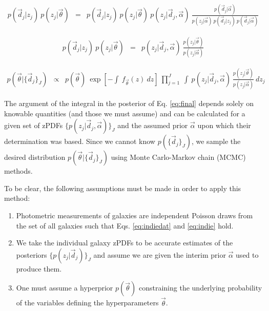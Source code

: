 \documentclass[preprint]{aastex}
\begin{document}
\begin{eqnarray}
\label{eq:indterm}
p(\vec{d}_{j}|z_{j})\ p(z_{j}|\vec{\theta}) &=& p(\vec{d}_{j}|z_{j})\ p(z_{j}|\vec{\theta})\ p(z_{j}|\vec{d}_{j},\vec{\alpha})\ \frac{p(\vec{d}_{j}|\vec{\alpha})}{p(z_{j}|\vec{\alpha})\ p(\vec{d}_{j}|z_{j})\ p(\vec{d}_{j}|\vec{\alpha})}
\end{eqnarray}

\begin{eqnarray}
\label{eq:cancel}
p(\vec{d}_{j}|z_{j})\ p(z_{j}|\vec{\theta}) &=& p(z_{j}|\vec{d}_{j},\vec{\alpha})\ \frac{p(z_{j}|\vec{\theta})}{p(z_{j}|\vec{\alpha})}
\end{eqnarray}

\begin{eqnarray}
\label{eq:final}
p(\vec{\theta}|\{\vec{d}_{j}\}_{J}) &\propto& p(\vec{\theta})\ \exp\left[-\int\ f_{\vec{\theta}}(z)\ dz\right]\ \prod_{j=1}^{J}\ \int\ p(z_{j}|\vec{d}_{j},\vec{\alpha})\ \frac{p(z_{j}|\vec{\theta})}{p(z_{j}|\vec{\alpha})}\ dz_{j}
\end{eqnarray}

The argument of the integral in the posterior of Eq. \ref{eq:final} depends solely on knowable quantities (and those we must assume) and can be calculated for a given set of zPDFs $\{p(z_{j}|\vec{d}_{j},\vec{\alpha})\}_{J}$ and the assumed prior $\vec{\alpha}$ upon which their determination was based.  Since we cannot know $p(\{\vec{d}_{j}\}_{J})$, we sample the desired distribution $p(\vec{\theta}|\{\vec{d}_{j}\}_{J})$ using Monte Carlo-Markov chain (MCMC) methods.  

To be clear, the following assumptions must be made in order to apply this method:

\begin{enumerate}
\item Photometric measurements of galaxies are independent Poisson draws from the set of all galaxies such that Eqs. \ref{eq:indiedat} and \ref{eq:indie} hold.
\item We take the individual galaxy zPDFs to be accurate estimates of the posteriors $\{p(z_{j}|\vec{d}_{j})\}_{J}$ and assume we are given the interim prior $\vec{\alpha}$ used to produce them.
\item One must assume a hyperprior $p(\vec{\theta})$ constraining the underlying probability of the variables defining the hyperparameters $\vec{\theta}$.
\end{enumerate}
\end{document}
